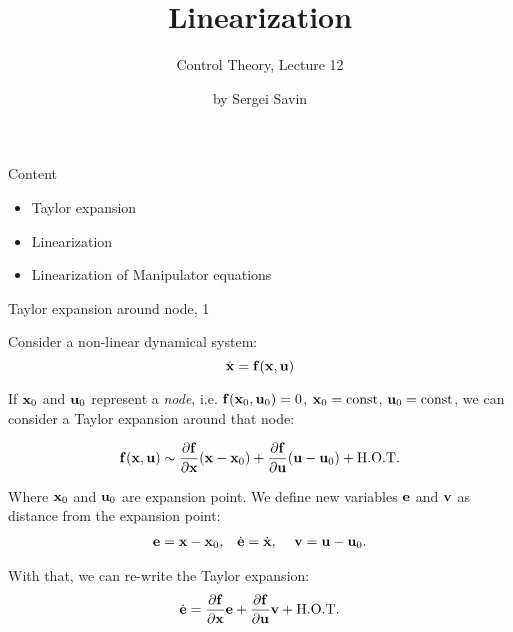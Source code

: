 \documentclass{beamer}
\title{Linearization}
\subtitle{Control Theory, Lecture 12}
\author{by Sergei Savin}
\date{\mydate}
\begin{document}
\maketitle


\begin{frame}{Content}
\begin{itemize}
	\item Taylor expansion
	\item Linearization
	\item Linearization of Manipulator equations
\end{itemize}
\end{frame}






\begin{frame}{Taylor expansion around node, 1}
	\begin{flushleft}
		
		Consider a non-linear dynamical system:
		\begin{equation}
			\dot{\mathbf{x}} = \mathbf{f}(\mathbf{x}, \mathbf{u})
		\end{equation}
	
		If $\mathbf{x}_0$ and $\mathbf{u}_0$ represent a \emph{node}, i.e. $\mathbf{f}(\mathbf{x}_0, \mathbf{u}_0) = 0$, $\mathbf{x}_0 = \text{const}$, $\mathbf{u}_0 = \text{const}$, we can consider a Taylor expansion around that node:
	
		\begin{equation}
			\mathbf{f}(\mathbf{x}, \mathbf{u}) 	\sim 
			\frac{\partial \mathbf{f}}{\partial \mathbf{x}} (\mathbf{x} - \mathbf{x}_0) + 
			\frac{\partial \mathbf{f}}{\partial \mathbf{u}} (\mathbf{u} - \mathbf{u}_0) + \text{H.O.T.}
		\end{equation}
	
		Where $\mathbf{x}_0$ and $\mathbf{u}_0$ are expansion point. We define new variables $\mathbf{e}$ and $\mathbf{v}$ as distance from the expansion point:
		\begin{align}
			\bo{e} = \bo{x} - \bo{x}_0, &\ \ \ 
			\dot{\bo{e}} = \dot{\bo{x}}, &\ 
			\bo{v} = \bo{u} - \bo{u}_0.
		\end{align}
		
		With that, we can re-write the Taylor expansion:
		\begin{align}
		\dot{\mathbf{e}} = \frac{\partial \mathbf{f}}{\partial \mathbf{x}} \mathbf{e} + 
		\frac{\partial \mathbf{f}}{\partial \mathbf{u}} \mathbf{v} + \text{H.O.T.}
		\end{align}		
		
		
	\end{flushleft}
\end{frame}
\end{document}
